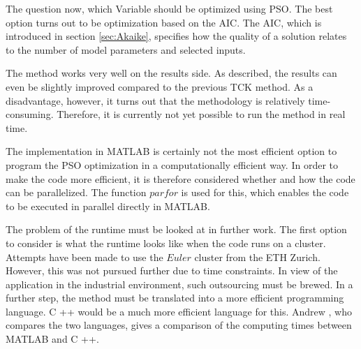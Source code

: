 The question now, which Variable should be optimized using PSO. The best option turns out to be optimization based on the AIC. The AIC, which is introduced in section \ref{sec:Akaike}, specifies how the quality of a solution relates to the number of model parameters and selected inputs.

The method works very well on the results side. As described, the results can even be slightly improved compared to the previous TCK method. As a disadvantage, however, it turns out that the methodology is relatively time-consuming. Therefore, it is currently not yet possible to run the method in real time.

The implementation in MATLAB is certainly not the most efficient option to program the PSO optimization in a computationally efficient way. In order to make the code more efficient, it is therefore considered whether and how the code can be parallelized. The function $parfor$ is used for this, which enables the code to be executed in parallel directly in MATLAB.

The problem of the runtime must be looked at in further work. The first option to consider is what the runtime looks like when the code runs on a cluster. Attempts have been made to use the $Euler$ cluster from the ETH Zurich. However, this was not pursued further due to time constraints. In view of the application in the industrial environment, such outsourcing must be brewed. In a further step, the method must be translated into a more efficient programming language. C ++ would be a much more efficient language for this. Andrew \cite{Andrews2017}, who compares the two languages, gives a comparison of the computing times between MATLAB and C ++.

\